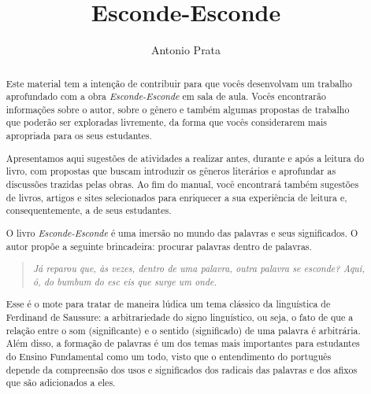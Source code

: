 \documentclass[11pt]{extarticle}
\newcommand{\AutorLivro}{Antonio Prata}
\newcommand{\TituloLivro}{Esconde-Esconde}
\newcommand{\colaborador}{Gabriela Karam}
\begin{document}
\title{\TituloLivro}
\author{\AutorLivro}
\def\authornotes{\colaborador}

\date{}
\maketitle


\tableofcontents


\begin{abstract}

Este material tem a intenção de contribuir para que vocês desenvolvam um trabalho aprofundado com a obra \textit{Esconde-Esconde} em sala de aula.
Vocês encontrarão informações sobre o autor, sobre o gênero e também 
algumas propostas de trabalho que poderão ser exploradas livremente, 
da forma que vocês considerarem mais apropriada para os seus estudantes.

Apresentamos aqui sugestões de atividades a realizar antes, durante e após a leitura do livro, com propostas que buscam introduzir os gêneros literários e aprofundar as discussões trazidas pelas obras. Ao fim do manual, você encontrará também sugestões de livros, artigos e sites selecionados para enriquecer a sua experiência de leitura e, consequentemente, a de seus estudantes.


O livro \textit{Esconde-Esconde} é uma imersão no mundo das palavras e seus significados. O autor propõe a seguinte brincadeira: procurar palavras dentro de palavras.

\begin{quote}

\textit{Já reparou que, às vezes, dentro de uma palavra, outra palavra se esconde? Aqui, ó, do bumbum do esc eis que surge um onde.}

\end{quote}

Esse é o mote para tratar de maneira lúdica um tema clássico da linguística de Ferdinand de Saussure: a arbitrariedade do signo linguístico, ou seja, o fato de que a relação entre o som (significante) e o sentido (significado) de uma palavra é arbitrária. Além disso, a formação de palavras é um dos temas mais importantes para estudantes do Ensino Fundamental como um todo, visto que o entendimento do português depende da compreensão dos usos e significados dos radicais das palavras e dos afixos que são adicionados a eles. 


\end{abstract}
\end{document}
